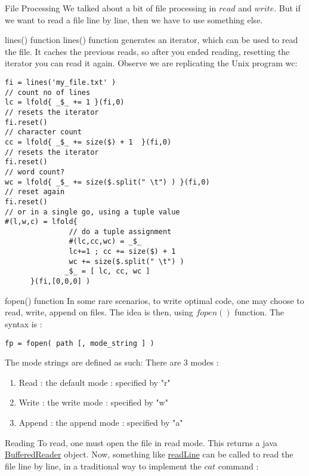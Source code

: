 \begin{section}{File Processing}
We talked about a bit of file processing in $read$ and $write$.
But if we want to read a file line by line, then we have to use something else.

\begin{subsection}{lines() function}
lines() function generates an iterator, which can be used to read the file.
It caches the previous reads, so after you ended reading, resetting the iterator 
you can read it again. Observe we are replicating the Unix program wc: 

\begin{lstlisting}[style=JexlStyle]
fi = lines('my_file.txt' )
// count no of lines 
lc = lfold{ _$_ += 1 }(fi,0)
// resets the iterator
fi.reset()
// character count 
cc = lfold{ _$_ += size($) + 1  }(fi,0)
// resets the iterator
fi.reset()
// word count?
wc = lfold{ _$_ += size($.split(" \t") ) }(fi,0)
// reset again 
fi.reset()
// or in a single go, using a tuple value 
#(l,w,c) = lfold{ 
               // do a tuple assignment 
               #(lc,cc,wc) = _$_ 
               lc+=1 ; cc += size($) + 1  
               wc += size($.split(" \t") )
              _$_ = [ lc, cc, wc ] 
      }(fi,[0,0,0] )
\end{lstlisting}
\end{subsection}

\begin{subsection}{fopen() function}
In some rare scenarios, to write optimal code, 
one may choose to read, write, append on files.
The idea is then, using $fopen()$ function.
The syntax is :

\begin{lstlisting}[style=JexlStyle]
fp = fopen( path [, mode_string ] )
\end{lstlisting}

The mode strings are defined as such:
There are 3 modes :
\begin{enumerate}
\item{ Read : the default mode : specified by "r" }
\item{ Write : the write mode : specified by "w"  }
\item{ Append : the append mode : specified by "a" }
\end{enumerate}

\end{subsection}

\begin{subsection}{Reading}
To read, one must open the file in read mode.
This returns a java \href{https://docs.oracle.com/javase/8/docs/api/java/io/BufferedReader.html}{BufferedReader} object.
Now, something like \href{https://docs.oracle.com/javase/8/docs/api/java/io/BufferedReader.html#readLine--}{readLine}
can be called to read the file line by line, in a traditional way to implement the $cat$ command : 


\end{subsection}
\end{section}
